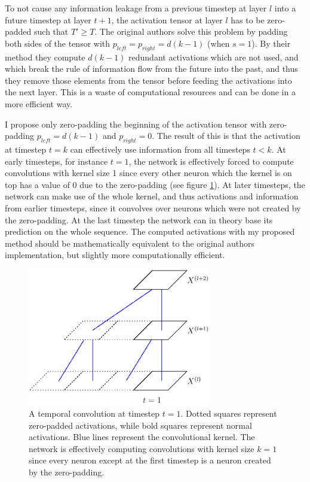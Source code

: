 \documentclass[a4paper, twoside]{article}
\begin{document}
To not cause any information leakage from a previous timestep at layer $l$ into a future timestep at layer $t+1$, the activation tensor at layer $l$ has to be zero-padded such that $T' \geq T$. The original authors \cite{tcn} solve this problem by padding both sides of the tensor with $p_{left} = p_{right} = d(k-1)$ (when $s=1$). By their method they compute $d(k-1)$ redundant activations which are not used, and which break the rule of information flow from the future into the past, and thus they remove those elements from the tensor before feeding the activations into the next layer. This is a waste of computational resources and can be done in a more efficient way.

I propose only zero-padding the beginning of the activation tensor with zero-padding $p_{left} = d(k-1)$ and $p_{right} = 0$. The result of this is that the activation at timestep $t=k$ can effectively use information from all timesteps $t<k$. At early timesteps, for instance $t=1$, the network is effectively forced to compute convolutions with kernel size 1 since every other neuron which the kernel is on top has a value of 0 due to the zero-padding (see figure \ref{figTCNZeropad}). At later timesteps, the network can make use of the whole kernel, and thus activations and information from earlier timesteps, since it convolves over neurons which were not created by the zero-padding. At the last timestep the network can in theory base its prediction on the whole sequence. The computed activations with my proposed method should be mathematically equivalent to the original authors implementation, but slightly more computationally efficient.


\begin{figure}[h]
\begin{center}
    \includegraphics[width=8cm]{figTCNZeropad.eps}\caption{A temporal convolution at timestep $t=1$. Dotted squares represent zero-padded activations, while bold squares represent normal activations. Blue lines represent the convolutional kernel. The network is effectively computing convolutions with kernel size $k=1$ since every neuron except at the first timestep is a neuron created by the zero-padding.}\label{figTCNZeropad}
\end{center}
\end{figure}
\end{document}
